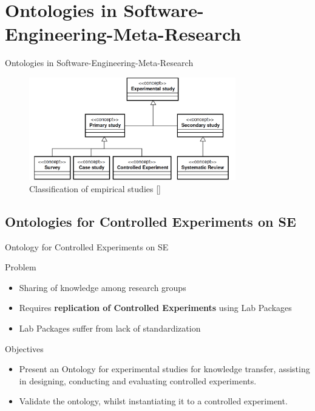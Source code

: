 \documentclass[16:9,en,navbarside]{sdqbeamer}
\begin{document}
\section{Ontologies in Software-Engineering-Meta-Research}

\begin{frame}{Ontologies in Software-Engineering-Meta-Research}
\pause
    \begin{figure}
		\includegraphics[width=9cm]{images/ClassificationStudies.PNG}
		\caption{Classification of empirical studies [\cite{Gar08}]}
	\end{figure}
\end{frame}


\subsection{Ontologies for Controlled Experiments on SE}
\begin{frame}{Ontology for Controlled Experiments on SE}
\begin{alertblock}{Problem}
    \begin{itemize}
        \item Sharing of knowledge among research groups
        \pause
        \item Requires \textbf{replication of Controlled Experiments} using Lab Packages
        \pause
        \item Lab Packages suffer from lack of standardization 
    \end{itemize}
\end{alertblock}
\pause
\begin{block}{Objectives}
\begin{itemize}
			\item Present an Ontology for experimental studies for knowledge transfer, assisting in designing, conducting and evaluating controlled experiments.
			\pause
			\item Validate the ontology, whilst instantiating it to a controlled experiment.
		\end{itemize}
\end{block}
\end{frame}
\end{document}
